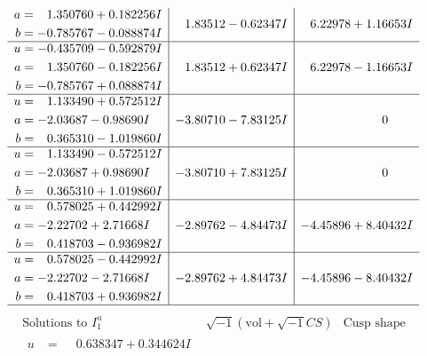 \documentclass[1p]{elsarticle_modified}
\theoremstyle{definition}
\newcommand{\I}{\sqrt{-1}}
\begin{document}
$$\begin{array}{c|c|c}
\begin{aligned}
a &= \phantom{-}1.350760 + 0.182256 I \\
b &= -0.785767 - 0.088874 I\end{aligned}
 & \phantom{-}1.83512 - 0.62347 I & \phantom{-}6.22978 + 1.16653 I \\ \hline\begin{aligned}
u &= -0.435709 - 0.592879 I \\
a &= \phantom{-}1.350760 - 0.182256 I \\
b &= -0.785767 + 0.088874 I\end{aligned}
 & \phantom{-}1.83512 + 0.62347 I & \phantom{-}6.22978 - 1.16653 I \\ \hline\begin{aligned}
u &= \phantom{-}1.133490 + 0.572512 I \\
a &= -2.03687 - 0.98690 I \\
b &= \phantom{-}0.365310 - 1.019860 I\end{aligned}
 & -3.80710 - 7.83125 I & \phantom{-0.000000 } 0 \\ \hline\begin{aligned}
u &= \phantom{-}1.133490 - 0.572512 I \\
a &= -2.03687 + 0.98690 I \\
b &= \phantom{-}0.365310 + 1.019860 I\end{aligned}
 & -3.80710 + 7.83125 I & \phantom{-0.000000 } 0 \\ \hline\begin{aligned}
u &= \phantom{-}0.578025 + 0.442992 I \\
a &= -2.22702 + 2.71668 I \\
b &= \phantom{-}0.418703 - 0.936982 I\end{aligned}
 & -2.89762 - 4.84473 I & -4.45896 + 8.40432 I \\ \hline\begin{aligned}
u &= \phantom{-}0.578025 - 0.442992 I \\
a &= -2.22702 - 2.71668 I \\
b &= \phantom{-}0.418703 + 0.936982 I\end{aligned}
 & -2.89762 + 4.84473 I & -4.45896 - 8.40432 I\\
 \hline 
 \end{array}$$\newpage$$\begin{array}{c|c|c}  
\text{Solutions to }I^u_{1}& \I (\text{vol} + \sqrt{-1}CS) & \text{Cusp shape}\\
 \hline 
\begin{aligned}
u &= \phantom{-}0.638347 + 0.344624 I \\

\end{aligned}
\end{array}$$
\end{document}
